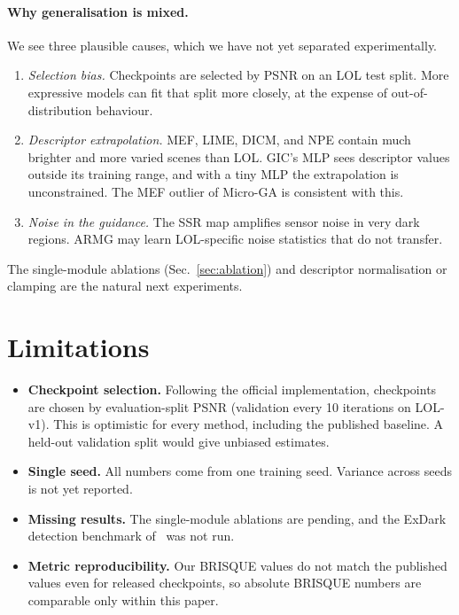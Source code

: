 \documentclass[10pt,twocolumn,letterpaper]{article}
\begin{document}
\paragraph{Why generalisation is mixed.}
We see three plausible causes, which we have not yet separated experimentally.
\begin{enumerate}
  \item \emph{Selection bias.} Checkpoints are selected by PSNR on an LOL test split.
  More expressive models can fit that split more closely, at the expense of
  out-of-distribution behaviour.
  \item \emph{Descriptor extrapolation.} MEF, LIME, DICM, and NPE contain much brighter
  and more varied scenes than LOL. GIC's MLP sees descriptor values outside its
  training range, and with a tiny MLP the extrapolation is unconstrained. The MEF
  outlier of Micro-GA is consistent with this.
  \item \emph{Noise in the guidance.} The SSR map amplifies sensor noise in very
  dark regions. ARMG may learn LOL-specific noise statistics that do not
  transfer.
\end{enumerate}
The single-module ablations (Sec.~\ref{sec:ablation}) and descriptor
normalisation or clamping are the natural next experiments.

\section{Limitations}
\label{sec:limitations}
\begin{itemize}
  \item \textbf{Checkpoint selection.} Following the official implementation,
  checkpoints are chosen by evaluation-split PSNR (validation every 10 iterations
  on LOL-v1). This is optimistic for every method, including the published
  baseline. A held-out validation split would give unbiased estimates.
  \item \textbf{Single seed.} All numbers come from one training seed. Variance
  across seeds is not yet reported.
  \item \textbf{Missing results.} The single-module ablations are pending, and the
  ExDark~\cite{loh2019exdark} detection benchmark of~\cite{brateanu2026multinex} was
  not run.
  \item \textbf{Metric reproducibility.} Our BRISQUE values do not match the
  published values even for released checkpoints, so absolute BRISQUE numbers are
  comparable only within this paper.
\end{itemize}
\end{document}
